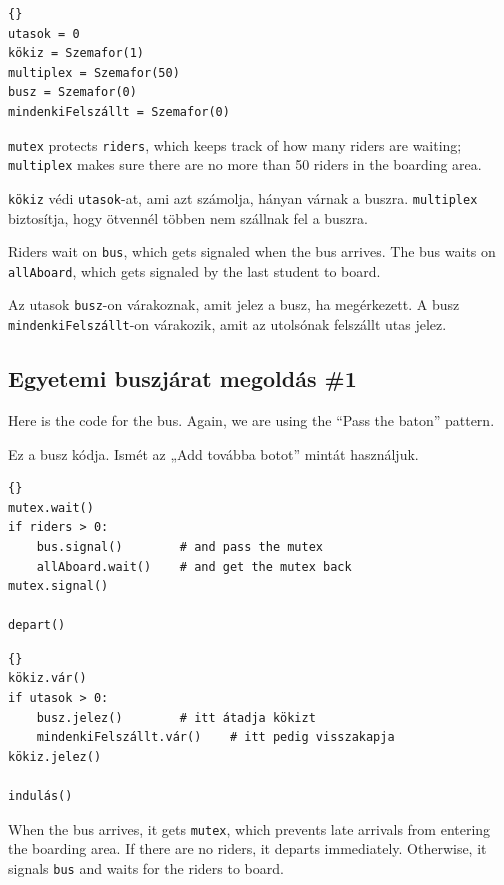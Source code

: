 \documentclass{book}
\newcommand{\clearemptydoublepage}{\newpage\cleardoublepage}
\begin{document}
\begin{lstlisting}[title={Egyetemi buszjárat tipp}]{}
utasok = 0
kökiz = Szemafor(1)
multiplex = Szemafor(50)
busz = Szemafor(0)
mindenkiFelszállt = Szemafor(0)
\end{lstlisting}

{\tt mutex} protects {\tt riders}, which keeps track of
how many riders are waiting;
{\tt multiplex} makes sure there are no more than 50 riders
in the boarding area.

{\tt kökiz} védi {\tt utasok}-at, ami azt számolja, hányan
várnak a buszra.
{\tt multiplex} biztosítja, hogy ötvennél többen nem szállnak fel a buszra.

Riders wait on
{\tt bus}, which gets signaled when the bus arrives.  The
bus waits on {\tt allAboard}, which gets signaled by the last
student to board.

Az utasok {\tt busz}-on várakoznak, amit jelez a busz, ha
megérkezett. A busz {\tt mindenkiFelszállt}-on várakozik,
amit az utolsónak felszállt utas jelez.


\clearemptydoublepage
\subsection{Egyetemi buszjárat megoldás \#1}

Here is the code for the bus.  Again, we are using the
``Pass the baton'' pattern.

Ez a busz kódja. Ismét az „Add továbba botot” mintát
használjuk.

\begin{lstlisting}[title={Bus problem solution (bus)}]{}
mutex.wait()
if riders > 0:
    bus.signal()        # and pass the mutex
    allAboard.wait()    # and get the mutex back
mutex.signal()

depart()
\end{lstlisting}

\begin{lstlisting}[title={Egyetemi buszjárat megoldás (busz)}]{}
kökiz.vár()
if utasok > 0:
    busz.jelez()        # itt átadja kökizt
    mindenkiFelszállt.vár()    # itt pedig visszakapja
kökiz.jelez()

indulás()
\end{lstlisting}

When the bus arrives, it gets {\tt mutex}, which
prevents late arrivals from entering the boarding area.  If there
are no riders, it departs immediately.  Otherwise, it signals {\tt bus}
and waits for the riders to board.
\end{document}
